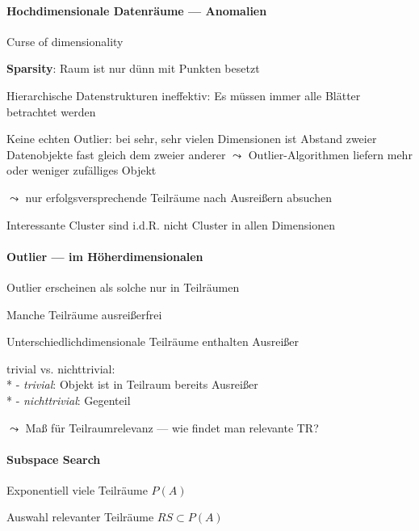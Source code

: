 \paragraph{Hochdimensionale Datenräume --- Anomalien}
\begin{items}
	\item Curse of dimensionality
	\item \textbf{Sparsity}: Raum ist nur dünn mit Punkten besetzt
	\item Hierarchische Datenstrukturen ineffektiv: Es müssen immer alle Blätter betrachtet werden
	\item Keine echten Outlier: bei sehr, sehr vielen Dimensionen ist Abstand zweier Datenobjekte fast gleich dem zweier anderer \( \leadsto \) Outlier-Algorithmen liefern mehr oder weniger zufälliges Objekt
	\item \( \leadsto \) nur erfolgsversprechende Teilräume nach Ausreißern absuchen
	\item Interessante Cluster sind i.d.R. nicht Cluster in allen Dimensionen
\end{items}

\paragraph{Outlier --- im Höherdimensionalen}
\begin{items}
	\item Outlier erscheinen als solche nur in Teilräumen
	\item Manche Teilräume ausreißerfrei
	\item Unterschiedlichdimensionale Teilräume enthalten Ausreißer
	\item trivial vs. nichttrivial: \\*
		- \emph{trivial}: Objekt ist in Teilraum bereits Ausreißer \\*
		- \emph{nichttrivial}: Gegenteil
	\item \( \leadsto \) Maß für Teilraumrelevanz --- wie findet man relevante TR?
\end{items}

\paragraph{Subspace Search}
\begin{items}
	\item Exponentiell viele Teilräume \( P(A) \)
	\item Auswahl relevanter Teilräume \( RS \subset P(A) \)
\end{items}

